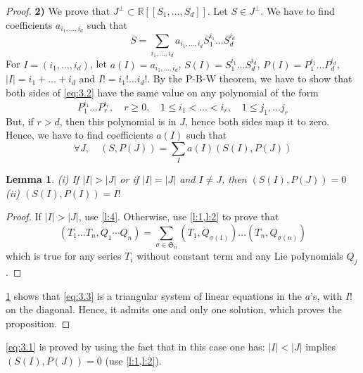 \documentclass[a4paper,12pt]{article}
\newtheorem{lemma}{Lemma}
\newcommand{\R}{\mathbb{R}}
\begin{document}
\begin{proof}
	\textbf{2)} We prove that $J^{\perp} \subset \R\left[\left[S_1, \ldots, S_d\right]\right]$. Let $S \in J^{\perp}$. We have to find coefficients $a_{i_1, \ldots, i_d}$ such that
	\begin{equation*} \label{eq:3.2} \tag{2}
		S=\sum_{i_1, \ldots, i_d} a_{i_1, \ldots, i_d} S_1^{i_1} \ldots S_d^{i_d}
	\end{equation*}
	For $I=\left(i_1, \ldots, i_d\right)$, let $a(I)=a_{i_1, \ldots, i_d}$, $S(I)=S_1^{i_1} \ldots S_d^{i_d}$, $P(I)={P}_1^{i_1} \ldots {P}_{{d}}^{i_{{d}}}$, $|I|=i_1+\ldots+i_{{d}}$ and $I !=i_{1} ! \ldots i_d!$. By the P-B-W theorem, we have to show that both sides of \eqref{eq:3.2} have the same value on any polynomial of the form
	\begin{equation*}
		{P}_1^{i_1} \ldots {P}_{{r}}^{{i}_{{r}}}, \quad {r} \geq 0, \quad 1 \leq {i}_1<\ldots<{i}_{{r}}, \quad 1 \leq j_1, \ldots j_{{r}}
	\end{equation*}
	But, if ${r}>{d}$, then this polynomial is in ${J}$, hence both sides map it to zero. Hence, we have to find coefficients $a(I)$ such that
	\begin{equation} \label{eq:3.3} \tag{3}
		\forall {J}, \quad ({S}, {P}({J}))=\sum_{{I}} {a}({I})({S}({I}), {P}({J}))
	\end{equation}

	\begin{lemma} \label{l:5}
		(i) If $|I|>|J|$ or if $|I|=|J|$ and $I \neq J$, then $(S(I), P(J))=0$ \\
		(ii) $(S(I),P(I))=I!$
	\end{lemma}
	
	\begin{proof}
		If $|I|>|J|$, use \cref{l:4}. Otherwise, use \cref{l:1,l:2} to prove that
		\begin{equation*}
			\left(T_1 \ldots T_n, Q_1 \cdots Q_n\right)=\sum_{\sigma \in \mathfrak{S}_n}\left(T_1, Q_{\sigma(1)}\right) \ldots\left(T_n, Q_{\sigma(n)}\right)
		\end{equation*}
		which is true for any series ${T}_i$ without constant term and any Lie poIynomials ${Q}_j$.
	\end{proof}

	\cref{l:5} shows that \eqref{eq:3.3} is a triangular system of linear equations in the $a$'s, with $I!$ on the diagonal. Hence, it admits one and only one solution, which proves the proposition.
\end{proof}


\eqref{eq:3.1} is proved by using the fact that in this case one has: $|I|<|J|$ implies $(S(I), P(J))=0$ (use \cref{l:1,l:2}).
\end{document}
